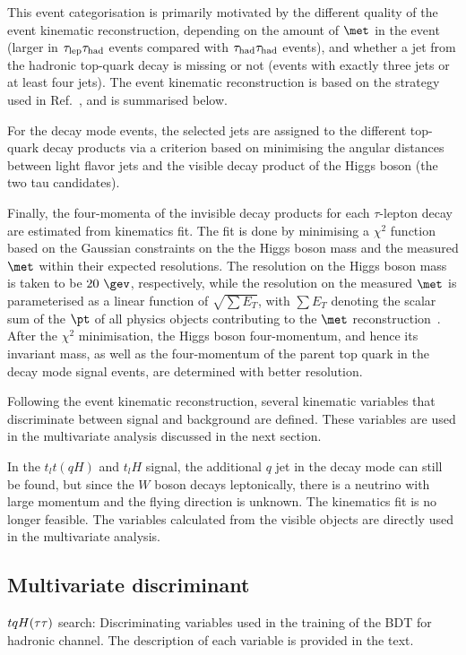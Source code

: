 This event categorisation is primarily motivated by the different quality of the event kinematic reconstruction, depending on the amount 
of $\met$ in the event (larger in $\tau_{\mathrm{lep}} \tau_{\mathrm{had}}$ events compared with $\tau_{\mathrm{had}} \tau_{\mathrm{had}}$ events), and whether a jet from the hadronic top-quark decay 
is missing or not (events with exactly three jets or at least four jets).
The event kinematic reconstruction is based on the strategy used in Ref.~\cite{Chen:2015nta}, and is summarised below.

For the decay mode events, the selected jets are assigned to the different top-quark decay products via a criterion based on 
minimising the angular distances between light flavor jets and the visible decay product of the Higgs boson (the two tau candidates).

Finally, the four-momenta of the invisible decay products for each $\tau$-lepton decay 
are estimated from kinematics fit. The fit is done by minimising a $\chi^2$ function based on the Gaussian constraints on the the Higgs boson mass and the
measured $\met$ within their expected resolutions. The resolution on the Higgs boson mass is taken to be $20~\gev$, respectively, while the resolution on the measured $\met$ is parameterised as a linear function of 
$\sqrt{\sum E_T}$, with $\sum E_T$ denoting the scalar sum of the $\pt$ of all physics objects contributing to the $\met$ reconstruction~\cite{Aaboud:2018tkc}.
After the $\chi^2$ minimisation, the Higgs boson four-momentum, and hence its invariant mass, as well as the 
four-momentum of the parent top quark in the decay mode signal events, are determined with better resolution. 

Following the event kinematic reconstruction, several kinematic variables that discriminate between signal and background are defined. These variables are used in the multivariate analysis discussed in the next section.

In the  $t_lt(qH)$ and $t_lH$ signal, the additional $q$ jet in the decay mode can still be found, but since the $W$ boson decays leptonically, there is a neutrino with large momentum and the flying direction is unknown. The kinematics fit is no longer feasible. The variables calculated from the visible objects are directly used in the multivariate analysis.

\subsection{Multivariate discriminant}

\begin{table*}[t!]
\caption{\small{$tqH(\tau\tau)$ search: Discriminating variables used in the training of the BDT for hadronic channel. 
The description of each variable is provided in the text.}}

\end{table*}


